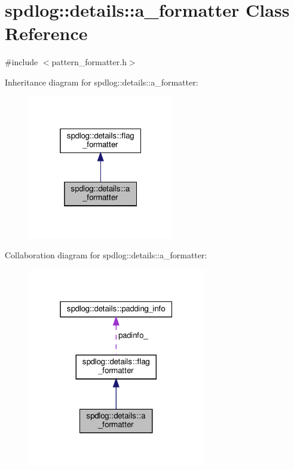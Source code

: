 \hypertarget{classspdlog_1_1details_1_1a__formatter}{}\section{spdlog\+:\+:details\+:\+:a\+\_\+formatter Class Reference}
\label{classspdlog_1_1details_1_1a__formatter}


{\ttfamily \#include $<$pattern\+\_\+formatter.\+h$>$}



Inheritance diagram for spdlog\+:\+:details\+:\+:a\+\_\+formatter\+:
\nopagebreak
\begin{figure}[H]
\begin{center}
\leavevmode
\includegraphics[width=181pt]{classspdlog_1_1details_1_1a__formatter__inherit__graph}
\end{center}
\end{figure}


Collaboration diagram for spdlog\+:\+:details\+:\+:a\+\_\+formatter\+:
\nopagebreak
\begin{figure}[H]
\begin{center}
\leavevmode
\includegraphics[width=220pt]{classspdlog_1_1details_1_1a__formatter__coll__graph}
\end{center}
\end{figure}
